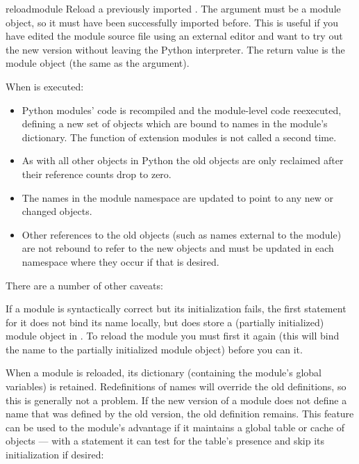 \begin{funcdesc}{reload}{module}
  Reload a previously imported .  The
  argument must be a module object, so it must have been successfully
  imported before.  This is useful if you have edited the module
  source file using an external editor and want to try out the new
  version without leaving the Python interpreter.  The return value is
  the module object (the same as the  argument).

  When  is executed:

\begin{itemize}

    \item Python modules' code is recompiled and the module-level code
    reexecuted, defining a new set of objects which are bound to names in
    the module's dictionary.  The  function of extension
    modules is not called a second time.

    \item As with all other objects in Python the old objects are only
    reclaimed after their reference counts drop to zero.

    \item The names in the module namespace are updated to point to
    any new or changed objects.

    \item Other references to the old objects (such as names external
    to the module) are not rebound to refer to the new objects and
    must be updated in each namespace where they occur if that is
    desired.

\end{itemize}

  There are a number of other caveats:

  If a module is syntactically correct but its initialization fails,
  the first  statement for it does not bind its name
  locally, but does store a (partially initialized) module object in
  .  To reload the module you must first
   it again (this will bind the name to the partially
  initialized module object) before you can  it.

  When a module is reloaded, its dictionary (containing the module's
  global variables) is retained.  Redefinitions of names will override
  the old definitions, so this is generally not a problem.  If the new
  version of a module does not define a name that was defined by the
  old version, the old definition remains.  This feature can be used
  to the module's advantage if it maintains a global table or cache of
  objects --- with a  statement it can test for the
  table's presence and skip its initialization if desired:


\end{funcdesc}

